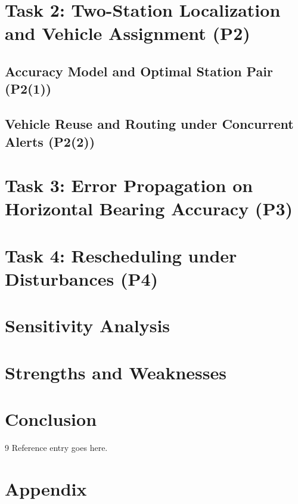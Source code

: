 \documentclass{swmcmthesis}
\begin{document}
\section{Task 2: Two-Station Localization and Vehicle Assignment (P2)}
\subsection{Accuracy Model and Optimal Station Pair (P2(1))}
\subsection{Vehicle Reuse and Routing under Concurrent Alerts (P2(2))}

\section{Task 3: Error Propagation on Horizontal Bearing Accuracy (P3)}

\section{Task 4: Rescheduling under Disturbances (P4)}

\section{Sensitivity Analysis}

\section{Strengths and Weaknesses}

\section{Conclusion}

\begin{thebibliography}{9}
 Reference entry goes here.
\end{thebibliography}

\newpage
\section*{Appendix}
\end{document}

